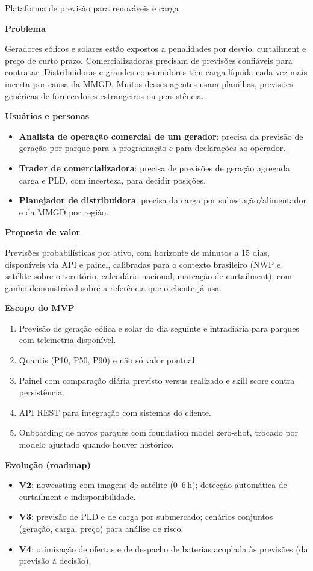 \documentclass[11pt,a4paper]{article}
\newcommand{\prodsec}[1]{\par\medskip\noindent\textbf{\color{prodcolor}#1}\par\smallskip}
\begin{document}
\begin{produto}{Plataforma de previsão para renováveis e carga}

\prodsec{Problema}
Geradores eólicos e solares estão expostos a penalidades por desvio,
curtailment e preço de curto prazo. Comercializadoras precisam de previsões
confiáveis para contratar. Distribuidoras e grandes consumidores têm carga
líquida cada vez mais incerta por causa da MMGD. Muitos desses agentes usam
planilhas, previsões genéricas de fornecedores estrangeiros ou persistência.

\prodsec{Usuários e personas}
\begin{itemize}
  \item \textbf{Analista de operação comercial de um gerador}: precisa da
    previsão de geração por parque para a programação e para declarações ao
    operador.
  \item \textbf{Trader de comercializadora}: precisa de previsões de geração
    agregada, carga e PLD, com incerteza, para decidir posições.
  \item \textbf{Planejador de distribuidora}: precisa da carga por
    subestação/alimentador e da MMGD por região.
\end{itemize}

\prodsec{Proposta de valor}
Previsões probabilísticas por ativo, com horizonte de minutos a 15 dias,
disponíveis via API e painel, calibradas para o contexto brasileiro (NWP e
satélite sobre o território, calendário nacional, marcação de curtailment),
com ganho demonstrável sobre a referência que o cliente já usa.

\prodsec{Escopo do MVP}
\begin{enumerate}
  \item Previsão de geração eólica e solar do dia seguinte e intradiária
    para parques com telemetria disponível.
  \item Quantis (P10, P50, P90) e não só valor pontual.
  \item Painel com comparação diária previsto versus realizado e skill score
    contra persistência.
  \item API REST para integração com sistemas do cliente.
  \item Onboarding de novos parques com foundation model zero-shot, trocado
    por modelo ajustado quando houver histórico.
\end{enumerate}

\prodsec{Evolução (roadmap)}
\begin{itemize}
  \item \textbf{V2}: nowcasting com imagens de satélite (0--6\,h);
    detecção automática de curtailment e indisponibilidade.
  \item \textbf{V3}: previsão de PLD e de carga por submercado; cenários
    conjuntos (geração, carga, preço) para análise de risco.
  \item \textbf{V4}: otimização de ofertas e de despacho de baterias acoplada
    às previsões (da previsão à decisão).
\end{itemize}


\end{produto}
\end{document}
